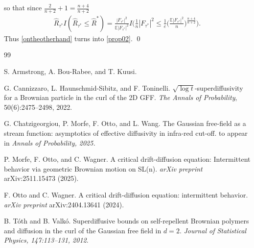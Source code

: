\documentclass[english, letterpaper,12pt,reqno]{amsart}
\theoremstyle{remark}
\theoremstyle{plain}
\newcommand{\1}{\mathbf{1}}
\newcommand{\E}{\mathbb{E}}
\begin{document}
%
so that since $ \frac{ 2 }{ n + 2 } + 1 = \frac{ n +  4 }{ n + 2 } $ 
%
\begin{align*}
	\hat R_{ \tau^* } I( \hat R_{ \tau^* } \leq \hat{R}^*)
	= \frac{ | F_{ \tau^* } |^2 }{ \E | F_{ \tau^* } |^2 } I \Big( { \textstyle \frac{ 1 }{ n } } | F_{ \tau^* } |^2 \leq { \textstyle \frac{ 1 }{ e } } \big( { \textstyle \frac{ \E | F_{ \tau^* } |^2  }{ n } } \big)^{ \frac{ n + 4 }{ n + 2 } } \Big) .
\end{align*}
%
Thus \eqref{ontheotherhand} turns into \eqref{prop02}. \qed

\begin{thebibliography}{99}

	S. Armstrong, A. Bou-Rabee, and T. Kuusi.

    G. Cannizzaro, L. Haunschmid-Sibitz, and F. Toninelli.
    \newblock $ \sqrt{ \log t } $-superdiffusivity for a
Brownian particle in the curl of the 2D GFF.
    \newblock \emph{The Annals of Probability}, 50(6):2475–2498, 2022.

    G. Chatzigeorgiou, P. Morfe, F. Otto, and L. Wang.
    \newblock The Gaussian free-field as
a stream function: asymptotics of effective diffusivity in infra-red cut-off.
    \newblock to appear in \emph{Annals of
Probability, 2025.}

    P. Morfe, F. Otto, and C. Wagner.
    \newblock A critical drift-diffusion equation: Intermittent
behavior via geometric Brownian motion on SL(n).
    \newblock \emph{arXiv preprint} arXiv:2511.15473 (2025).

    F. Otto and C. Wagner.
    \newblock A critical drift-diffusion equation: intermittent behavior. \newblock \emph{arXiv
preprint} arXiv:2404.13641 (2024).

    B. Tóth and B. Valkó.
    \newblock Superdiffusive bounds on self-repellent Brownian polymers and
diffusion in the curl of the Gaussian free field in $ d = 2 $.
    \newblock \emph{Journal of Statistical Physics, 147:113–131,
2012}.

\end{thebibliography}

%
\end{document}
